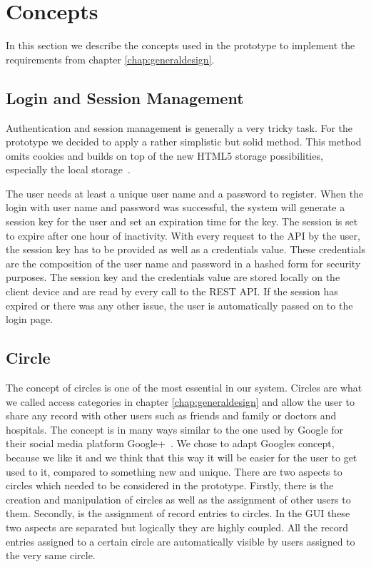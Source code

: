 \section{Concepts}

In this section we describe the concepts used in the prototype to implement the requirements from chapter \ref{chap:generaldesign}. 

\subsection{Login and Session Management}\label{loginSession}

Authentication and session management is generally a very tricky task. For the prototype we decided to apply a rather simplistic but solid method. This method omits cookies and builds on top of the new HTML5 storage possibilities, especially the local storage~\cite{localstorage}.

The user needs at least a unique user name and a password to register. When the login with user name and password was successful, the system will generate a session key for the user and set an expiration time for the key. The session is set to expire after one hour of inactivity. With every request to the API by the user, the session key has to be provided as well as a credentials value. These credentials are the composition of the user name and password in a hashed form for security purposes. The session key and the credentials value are stored locally on the client device and are read by every call to the REST API. If the session has expired or there was any other issue, the user is automatically passed on to the login page. 

\subsection{Circle}

The concept of circles is one of the most essential in our system. Circles are what we called access categories in chapter \ref{chap:generaldesign} and allow the user to share any record with other users such as friends and family or doctors and hospitals. The concept is in many ways similar to the one used by Google for their social media platform Google+~\cite{googlePlus}. We chose to adapt Googles concept, because we like it and we think that this way it will be easier for the user to get used to it, compared to something new and unique. \newline
There are two aspects to circles which needed to be considered in the prototype. Firstly, there is the creation and manipulation of circles as well as the assignment of other users to them. Secondly, is the assignment of record entries to circles. In the GUI these two aspects are separated but logically they are highly coupled. All the record entries assigned to a certain circle are automatically visible by users assigned to the very same circle. 

